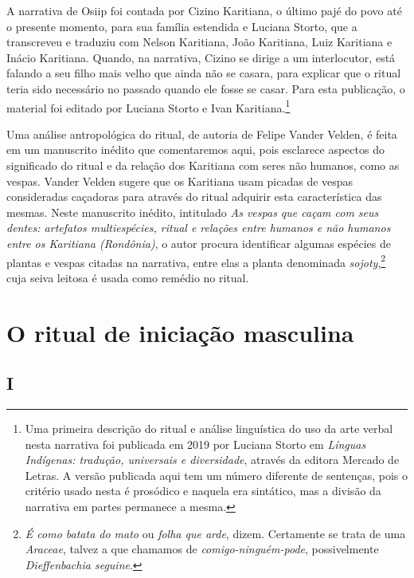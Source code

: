  A narrativa de Osiip foi contada por Cizino Karitiana, o último pajé do
 povo até o presente momento, para sua família estendida e Luciana
 Storto, que a transcreveu e traduziu com Nelson Karitiana, João
 Karitiana, Luiz Karitiana e Inácio Karitiana. Quando, na narrativa,
 Cizino se dirige a um interlocutor, está falando a seu filho mais velho
 que ainda não se casara, para explicar que o ritual teria sido
 necessário no passado quando ele fosse se casar. Para esta publicação, o
 material foi editado por Luciana Storto e Ivan Karitiana.\footnote{Uma primeira descrição do ritual e análise linguística do uso da arte
 verbal nesta narrativa foi publicada em 2019 por Luciana Storto em
 \textit{Línguas Indígenas: tradução, universais e diversidade}, através da
 editora Mercado de Letras. A versão publicada aqui tem um número
 diferente de sentenças, pois o critério usado nesta é prosódico e
 naquela era sintático, mas a divisão da narrativa em partes permanece a
 mesma.}

 Uma análise antropológica do ritual, de autoria de Felipe Vander Velden,
 é feita em um manuscrito inédito que comentaremos aqui, pois esclarece
 aspectos do significado do ritual e da relação dos Karitiana com seres
 não humanos, como as vespas. Vander Velden sugere que os Karitiana usam
 picadas de vespas consideradas caçadoras para através do ritual adquirir
 esta característica das mesmas. Neste manuscrito inédito, intitulado
\textit{As vespas que caçam com seus dentes: artefatos multiespécies, ritual e
 relações entre humanos e não humanos entre os Karitiana (Rondônia)}, o
 autor procura identificar algumas espécies de plantas e vespas citadas
 na narrativa, entre elas a planta denominada \textit{sojoty},\footnote{\textit{É como batata do mato} ou \textit{folha que arde},
 dizem. Certamente se trata de uma \textit{Araceae}, talvez a que chamamos
 de \textit{comigo-ninguém-pode}, possivelmente \textit{Dieffenbachia
 seguine}.} cuja seiva
 leitosa é usada como remédio no ritual.


 \chapter{O ritual de iniciação masculina}
 

\section{I}

